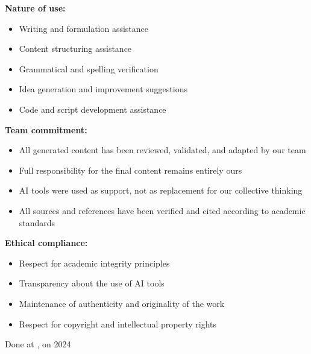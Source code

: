 {{        \vspace{0.5cm}
        
        \textbf{Nature of use:}
        \begin{itemize}
            \item Writing and formulation assistance
            \item Content structuring assistance
            \item Grammatical and spelling verification
            \item Idea generation and improvement suggestions
            \item Code and script development assistance
        \end{itemize}
        
        \vspace{0.5cm}
        
        \textbf{Team commitment:}
        \begin{itemize}
            \item All generated content has been reviewed, validated, and adapted by our team
            \item Full responsibility for the final content remains entirely ours
            \item AI tools were used as support, not as replacement for our collective thinking
            \item All sources and references have been verified and cited according to academic standards
        \end{itemize}
        
        \vspace{0.5cm}
        
        \textbf{Ethical compliance:}
        \begin{itemize}
            \item Respect for academic integrity principles
            \item Transparency about the use of AI tools
            \item Maintenance of authenticity and originality of the work
            \item Respect for copyright and intellectual property rights
        \end{itemize}
        
        \vspace{1cm}
        
        \begin{flushright}
        Done at \underline{\hspace{2cm}}, on \underline{\hspace{2cm}} \underline{\hspace{2cm}} 2024
        
        \vspace{1cm}
        
        \underline{\hspace{4cm}}
        
        \textbf{\AuthorName}
        \end{flushright}
    }
}{}